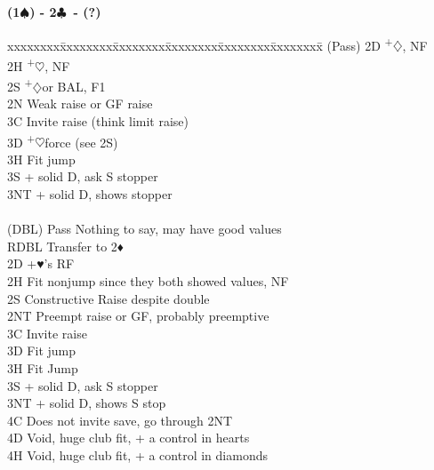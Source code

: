 \documentclass[10pt]{article}
\renewcommand{\c}{$\clubsuit$}
\renewcommand{\d}{$\diamondsuit$}
\newcommand{\h}{$\heartsuit$}
\newcommand{\s}{$\spadesuit$}
\newcommand{\p}{\textsuperscript{+}}
\newcommand{\x}{DBL}
\newenvironment{bidtable}[1][]
{\textbf{#1}
  \begin{adjustwidth}{1em}{}
    \addvspace{2pt}
    \begin{tabbing}
      xxxxxxxx\=xxxxxxxx\=xxxxxxxx\=xxxxxxxx\=xxxxxxxx\=xxxxxxxx\=\kill}
{\end{tabbing}\end{adjustwidth}\bigskip}%
\begin{document}
\begin{multicols*}{2}
\begin{bidtable}[(1\s) - 2\c\ - (?)]
(Pass) \> 2D   \p\d, NF                                      \\
       \> 2H   \p\h, NF                                      \\
       \> 2S   \p\d or BAL, F1                               \\
       \> 2N   \> Weak raise or GF raise                         \\
       \> 3C   \> Invite raise (think limit raise)               \\
       \> 3D   \p\h force (see 2S)                             \\
       \> 3H   \> Fit jump                                       \\
       \> 3S   + solid D, ask S stopper                      \\
       \> 3NT  + solid D, shows stopper                      \\
                                                                 \\
(\x)   \> Pass \> Nothing to say, may have good values           \\
       \> RDBL \> Transfer to 2♦                                 \\
       \> 2D   +♥’s RF                                       \\
       \> 2H   \> Fit nonjump since they both showed values, NF  \\
       \> 2S   \> Constructive Raise despite double              \\
       \> 2NT  \> Preempt raise or GF, probably preemptive       \\
       \> 3C   \> Invite raise                                   \\
       \> 3D   \> Fit jump                                       \\
       \> 3H   \> Fit Jump                                       \\
       \> 3S   + solid D, ask S stopper                      \\
       \> 3NT  + solid D, shows S stop                       \\
       \> 4C   \> Does not invite save, go through 2NT           \\
       \> 4D   \> Void, huge club fit, + a control in hearts     \\
       \> 4H   \> Void, huge club fit, + a control in diamonds   \\

\end{bidtable}
\end{multicols*}
\end{document}
